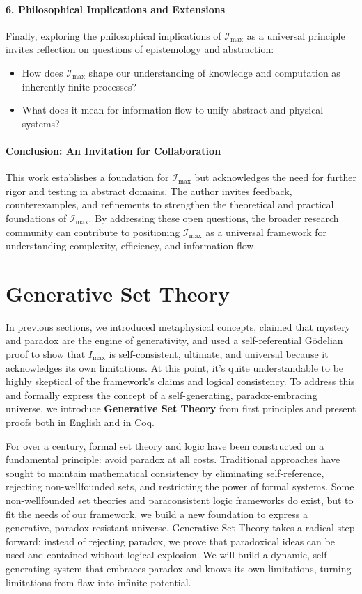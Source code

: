 \documentclass[12pt]{article}
\begin{document}
\paragraph{6. Philosophical Implications and Extensions}
Finally, exploring the philosophical implications of \(\mathcal{I}_{\text{max}}\) as a universal principle invites reflection on questions of epistemology and abstraction:
\begin{itemize}
    \item How does \(\mathcal{I}_{\text{max}}\) shape our understanding of knowledge and computation as inherently finite processes?
    \item What does it mean for information flow to unify abstract and physical systems?
\end{itemize}

\paragraph{Conclusion: An Invitation for Collaboration}
This work establishes a foundation for \(\mathcal{I}_{\text{max}}\) but acknowledges the need for further rigor and testing in abstract domains. The author invites feedback, counterexamples, and refinements to strengthen the theoretical and practical foundations of \(\mathcal{I}_{\text{max}}\). By addressing these open questions, the broader research community can contribute to positioning \(\mathcal{I}_{\text{max}}\) as a universal framework for understanding complexity, efficiency, and information flow.


\section{Generative Set Theory}

In previous sections, we introduced metaphysical concepts, claimed that mystery and paradox are the engine of generativity, and used a self-referential Gödelian proof to show that $I_\text{max}$ is self-consistent, ultimate, and universal because it acknowledges its own limitations. At this point, it's quite understandable to be highly skeptical of the framework's claims and logical consistency. To address this and formally express the concept of a self-generating, paradox-embracing universe, we introduce \textbf{Generative Set Theory} from first principles and present proofs both in English and in Coq.

For over a century, formal set theory and logic have been constructed on a fundamental principle: avoid paradox at all costs. Traditional approaches have sought to maintain mathematical consistency by eliminating self-reference, rejecting non-wellfounded sets, and restricting the power of formal systems. Some non-wellfounded set theories and paraconsistent logic frameworks do exist, but to fit the needs of our framework, we build a new foundation to express a generative, paradox-resistant universe. Generative Set Theory takes a radical step forward: instead of rejecting paradox, we prove that paradoxical ideas can be used and contained without logical explosion. We will build a dynamic, self-generating system that embraces paradox and knows its own limitations, turning limitations from flaw into infinite potential.
\end{document}
